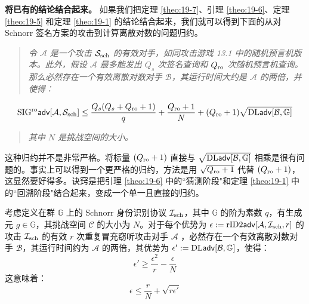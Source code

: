 \noindent
\textbf{将已有的结论结合起来。}
如果我们把定理 \ref{theo:19-7}、引理 \ref{theo:19-6}、定理 \ref{theo:19-5} 和定理 \ref{theo:19-1} 的结论结合起来，我们就可以得到下面的从对 Schnorr 签名方案的攻击到计算离散对数的问题归约。

\begin{quote}
\emph{令 $\mathcal{A}$ 是一个攻击 $\mathcal{S}_{\rm sch}$ 的有效对手，如同攻击游戏 13.1 中的随机预言机版本。此外，假设 $\mathcal{A}$ 最多能发出 $Q_s$ 次签名查询和 $Q_{\rm ro}$ 次随机预言机查询。那么必然存在一个有效离散对数对手 $\mathcal{B}$，其运行时间大约是 $\mathcal{A}$ 的两倍，并使得：}
\end{quote}
\begin{equation}\label{eq:19-6}
{\rm SIG^{ro}\mathsf{adv}}[\mathcal{A},\mathcal{S}_{\rm sch}]\leq\frac{Q_s(Q_s+Q_{\rm ro}+1)}{q}+\frac{Q_{\rm ro}+1}{N}+(Q_{\rm ro}+1)\sqrt{{\rm DL\mathsf{adv}}[\mathcal{B},\mathbb{G}]}
\end{equation}
\begin{quote}
\emph{其中 $N$ 是挑战空间的大小。}
\end{quote}

这种归约并不是非常严格。将标量 $(Q_{\rm ro}+1)$ 直接与 $\sqrt{{\rm DL\mathsf{adv}}[\mathcal{B},\mathbb{G}]}$ 相乘是很有问题的。事实上可以得到一个更严格的归约，方法是用 $\sqrt{Q_{\rm ro}+1}$ 代替 $(Q_{\rm ro}+1)$，这显然要好得多。诀窍是把引理 \ref{theo:19-6} 中的``猜测阶段"和定理 \ref{theo:19-1} 中的``回溯阶段"结合起来，变成一个单一且直接的归约。

\begin{lemma}\label{theo:19-8}
考虑定义在群 $\mathbb{G}$ 上的 Schnorr 身份识别协议 $\mathcal{I}_{\rm sch}$，其中 $\mathbb{G}$ 的阶为素数 $q$，有生成元 $g\in\mathbb{G}$，其挑战空间 $\mathcal{C}$ 的大小为 $N$。对于每个优势为 $\epsilon:={\rm rID2\mathsf{adv}}[\mathcal{A},\mathcal{I}_{\rm sch},r]$ 的攻击 $\mathcal{I}_{\rm sch}$ 的有效 $r$ 次重复冒充窃听攻击对手 $\mathcal{A}$ ，必然存在一个有效离散对数对手 $\mathcal{B}$，其运行时间约为 $\mathcal{A}$ 的两倍，其优势为 $\epsilon':={\rm DL\mathsf{adv}}[\mathcal{B},\mathbb{G}]$，使得：
\begin{equation}\label{eq:19-7}
\epsilon'\geq\frac{\epsilon^2}{r}-\frac{\epsilon}{N}
\end{equation}
这意味着：
\begin{equation}\label{eq:19-8}
\epsilon\leq\frac{r}{N}+\sqrt{r\epsilon'}
\end{equation}
\end{lemma}


